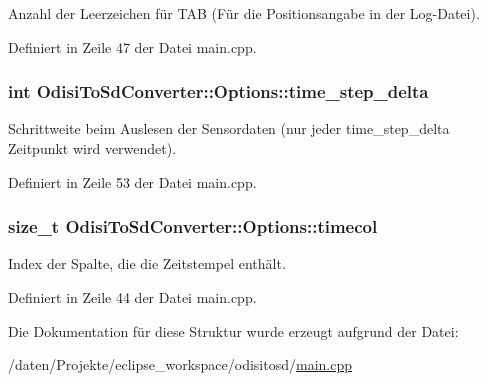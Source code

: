 Anzahl der Leerzeichen für T\-A\-B (Für die Positionsangabe in der Log-\/\-Datei). 



Definiert in Zeile 47 der Datei main.\-cpp.

\hypertarget{structOdisiToSdConverter_1_1Options_a2e5c6038a0ff5ca7d32be89740b82aa4}{
\subsubsection[{time\-\_\-step\-\_\-delta}]{\setlength{\rightskip}{0pt plus 5cm}int Odisi\-To\-Sd\-Converter\-::\-Options\-::time\-\_\-step\-\_\-delta}}\label{structOdisiToSdConverter_1_1Options_a2e5c6038a0ff5ca7d32be89740b82aa4}


Schrittweite beim Auslesen der Sensordaten (nur jeder time\-\_\-step\-\_\-delta Zeitpunkt wird verwendet). 



Definiert in Zeile 53 der Datei main.\-cpp.

\hypertarget{structOdisiToSdConverter_1_1Options_a43e744e0769d2b436c56ee6a9e410613}{
\subsubsection[{timecol}]{\setlength{\rightskip}{0pt plus 5cm}size\-\_\-t Odisi\-To\-Sd\-Converter\-::\-Options\-::timecol}}\label{structOdisiToSdConverter_1_1Options_a43e744e0769d2b436c56ee6a9e410613}


Index der Spalte, die die Zeitstempel enthält. 



Definiert in Zeile 44 der Datei main.\-cpp.



Die Dokumentation für diese Struktur wurde erzeugt aufgrund der Datei\-:\begin{DoxyCompactItemize}
\item 
/daten/\-Projekte/eclipse\-\_\-workspace/odisitosd/\hyperlink{odisitosd_2main_8cpp}{main.\-cpp}\end{DoxyCompactItemize}
